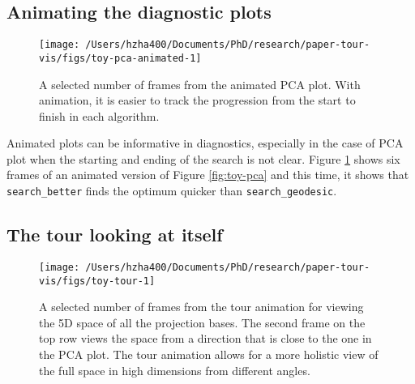 \hypertarget{animating-the-diagnostic-plots}{%
\subsection{Animating the diagnostic
plots}\label{animating-the-diagnostic-plots}}

\begin{Schunk}
\begin{figure}

{\centering \texttt{[image: /Users/hzha400/Documents/PhD/research/paper-tour-vis/figs/toy-pca-animated-1]} 

}

\caption[A selected number of frames from the animated PCA plot]{A selected number of frames from the animated PCA plot. With animation, it is easier to track the progression from the start to finish in each algorithm.}\label{fig:toy-pca-animated}
\end{figure}
\end{Schunk}

Animated plots can be informative in diagnostics, especially in the case
of PCA plot when the starting and ending of the search is not clear.
Figure \ref{fig:toy-pca-animated} shows six frames of an animated
version of Figure \ref{fig:toy-pca} and this time, it shows that
\texttt{search\_better} finds the optimum quicker than
\texttt{search\_geodesic}.

\hypertarget{the-tour-looking-at-itself}{%
\subsection{The tour looking at
itself}\label{the-tour-looking-at-itself}}

\begin{Schunk}
\begin{figure}

{\centering \texttt{[image: /Users/hzha400/Documents/PhD/research/paper-tour-vis/figs/toy-tour-1]} 

}

\caption[A selected number of frames from the tour animation for viewing the 5D space of all the projection bases]{A selected number of frames from the tour animation for viewing the 5D space of all the projection bases. The second frame on the top row views the space from a direction that is close to the one in the PCA plot. The tour animation allows for a more holistic view of the full space in high dimensions from different angles.}\label{fig:toy-tour}
\end{figure}
\end{Schunk}

